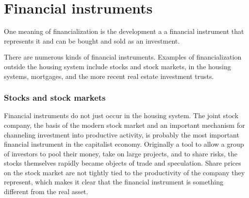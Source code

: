 \section{Financial instruments} \label{section-financial-instruments}
One meaning of financialization is the development a 
a  \gls{financial instrument} that represents it and can be bought and sold as an investment.

There are numerous kinds of financial instruments.
Examples of financialization outside the housing system include stocks and stock markets, in the housing systems, mortgages, and the more recent real estate investment trusts. 

\subsubsection{Stocks and stock markets}
Financial instruments do not just occur in the housing system. 
The \gls{joint stock company}, the basis of the modern stock market and an important mechanism for channeling investment  into productive activity,  is probably the most important financial instrument in the capitalist economy. Originally a tool to allow a group of investors to pool their money, take on large projects, and to share risks, the stocks themselves rapidly became objects of trade and speculation. Share prices on the stock market are not tightly tied to the productivity of the company they represent, which makes it clear that the financial instrument is something different from the real asset. 


